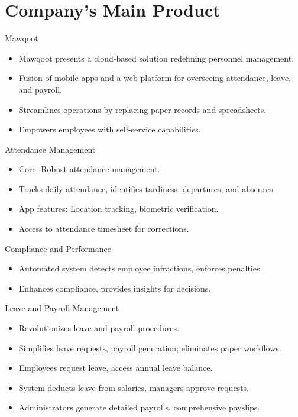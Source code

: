 \documentclass{loyola-beamer}
\begin{document}
\section{Company's Main Product}

\begin{frame}{Mawqoot}
    \begin{itemize}
        \item Mawqoot presents a cloud-based solution redefining personnel management.
        \item Fusion of mobile apps and a web platform for overseeing attendance, leave, and payroll.
        \item Streamlines operations by replacing paper records and spreadsheets.
        \item Empowers employees with self-service capabilities.
    \end{itemize}
\end{frame}

\begin{frame}{Attendance Management}
    \begin{itemize}
        \item Core: Robust attendance management.
        \item Tracks daily attendance, identifies tardiness, departures, and absences.
        \item App features: Location tracking, biometric verification.
        \item Access to attendance timesheet for corrections.
    \end{itemize}
\end{frame}

\begin{frame}{Compliance and Performance}
    \begin{itemize}
        \item Automated system detects employee infractions, enforces penalties.
        \item Enhances compliance, provides insights for decisions.
    \end{itemize}
\end{frame}

\begin{frame}{Leave and Payroll Management}
    \begin{itemize}
        \item Revolutionizes leave and payroll procedures.
        \item Simplifies leave requests, payroll generation; eliminates paper workflows.
        \item Employees request leave, access annual leave balance.
        \item System deducts leave from salaries, managers approve requests.
        \item Administrators generate detailed payrolls, comprehensive payslips.
    \end{itemize}
\end{frame}
\end{document}
